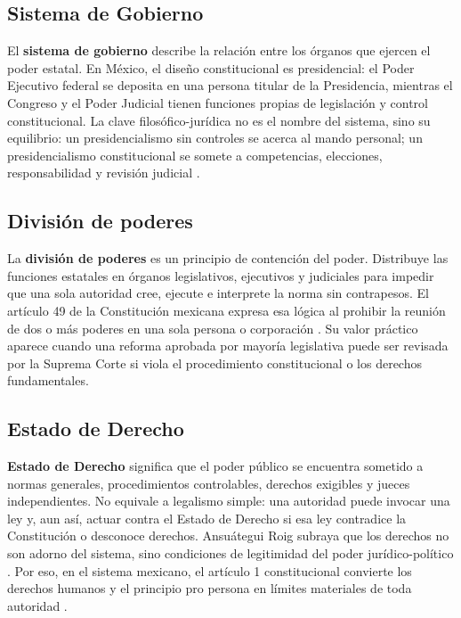 \documentclass[
	spanish,
	letterpaper, oneside
]{article}
\begin{document}
\subsection{Sistema de Gobierno}

El \textbf{sistema de gobierno} describe la relación entre los órganos que ejercen el poder estatal. En México, el diseño constitucional es presidencial: el Poder Ejecutivo federal se deposita en una persona titular de la Presidencia, mientras el Congreso y el Poder Judicial tienen funciones propias de legislación y control constitucional. La clave filosófico-jurídica no es el nombre del sistema, sino su equilibrio: un presidencialismo sin controles se acerca al mando personal; un presidencialismo constitucional se somete a competencias, elecciones, responsabilidad y revisión judicial \citep{cpeum2026,rodriguezFilosofiaDerecho2020}.

\subsection{División de poderes}

La \textbf{división de poderes} es un principio de contención del poder. Distribuye las funciones estatales en órganos legislativos, ejecutivos y judiciales para impedir que una sola autoridad cree, ejecute e interprete la norma sin contrapesos. El artículo 49 de la Constitución mexicana expresa esa lógica al prohibir la reunión de dos o más poderes en una sola persona o corporación \citep{cpeum2026}. Su valor práctico aparece cuando una reforma aprobada por mayoría legislativa puede ser revisada por la Suprema Corte si viola el procedimiento constitucional o los derechos fundamentales.

\subsection{Estado de Derecho}

\textbf{Estado de Derecho} significa que el poder público se encuentra sometido a normas generales, procedimientos controlables, derechos exigibles y jueces independientes. No equivale a legalismo simple: una autoridad puede invocar una ley y, aun así, actuar contra el Estado de Derecho si esa ley contradice la Constitución o desconoce derechos. Ansuátegui Roig subraya que los derechos no son adorno del sistema, sino condiciones de legitimidad del poder jurídico-político \citep{ansuategui2007}. Por eso, en el sistema mexicano, el artículo 1 constitucional convierte los derechos humanos y el principio pro persona en límites materiales de toda autoridad \citep{cpeum2026}.
\end{document}
